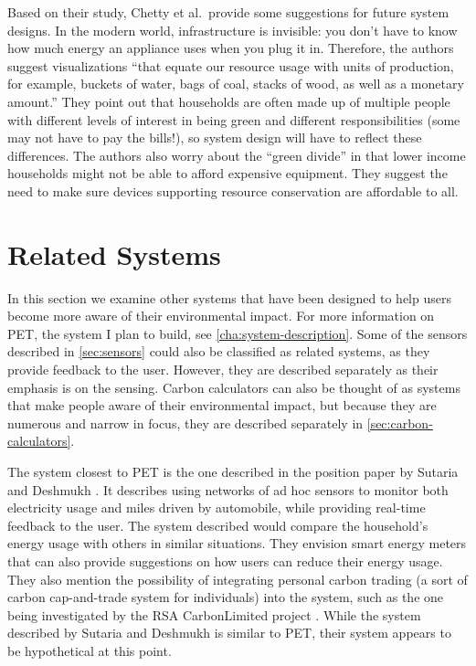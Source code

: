 Based on their study, Chetty et al.\ provide some suggestions for future system designs. In the modern world, infrastructure is invisible: you don't have to know how much energy an appliance uses when you plug it in. Therefore, the authors suggest visualizations ``that equate our resource usage with units of production, for example, buckets of water, bags of coal, stacks of wood, as well as a monetary amount.'' They point out that households are often made up of multiple people with different levels of interest in being green and different responsibilities (some may not have to pay the bills!), so system design will have to reflect these differences. The authors also worry about the ``green divide'' in that lower income households might not be able to afford expensive equipment. They suggest the need to make sure devices supporting resource conservation are affordable to all.


\section{Related Systems}
\label{sec:related-systems}

In this section we examine other systems that have been designed to help users become more aware of their environmental impact. For more information on PET, the system I plan to build, see \autoref{cha:system-description}. Some of the sensors described in \autoref{sec:sensors} could also be classified as related systems, as they provide feedback to the user. However, they are described separately as their emphasis is on the sensing. Carbon calculators can also be thought of as systems that make people aware of their environmental impact, but because they are numerous and narrow in focus, they are described separately in \autoref{sec:carbon-calculators}.

The system closest to PET is the one described in the position paper by Sutaria and Deshmukh \cite{sutaria-2008}. It describes using networks of ad hoc sensors to monitor both electricity usage and miles driven by automobile, while providing real-time feedback to the user. The system described would compare the household's energy usage with others in similar situations. They envision smart energy meters that can also provide suggestions on how users can reduce their energy usage. They also mention the possibility of integrating personal carbon trading (a sort of carbon cap-and-trade system for individuals) into the system, such as the one being investigated by the RSA CarbonLimited project \cite{carbonlimited-2007}. While the system described by Sutaria and Deshmukh is similar to PET, their system appears to be hypothetical at this point.

